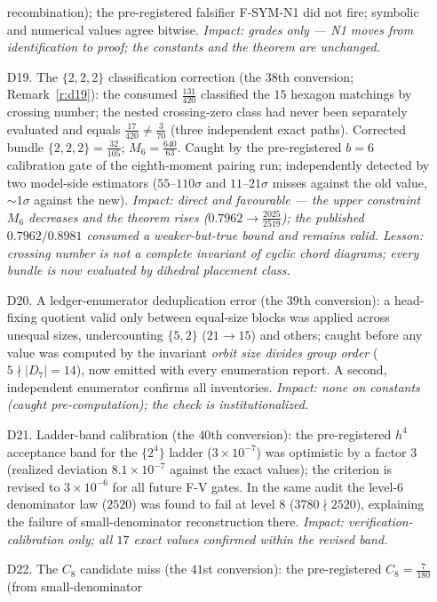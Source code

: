 \documentclass[11pt]{article}
\numberwithin{equation}{section}
\theoremstyle{definition}
\theoremstyle{remark}
\begin{document}
\begin{itemize}
recombination); the pre-registered falsifier F-SYM-N1 did not
fire; symbolic and numerical values agree bitwise.
\emph{Impact: grades only --- N1 moves from identification to
proof; the constants and the theorem are unchanged.}
\item[D19.] The $\{2,2,2\}$ classification correction (the
$38$th conversion; Remark~\ref{r:d19}): the consumed
$\tfrac{131}{420}$ classified the $15$ hexagon matchings by
crossing number; the nested crossing-zero class had never been
separately evaluated and equals $\tfrac{17}{420}\ne\tfrac3{70}$
(three independent exact paths). Corrected bundle
$\{2,2,2\}=\tfrac{32}{105}$; $M_6=\tfrac{640}{63}$. Caught by
the pre-registered $b=6$ calibration gate of the
eighth-moment pairing run; independently detected by two
model-side estimators ($55$--$110\sigma$ and $11$--$21\sigma$
misses against the old value, $\sim1\sigma$ against the new).
\emph{Impact: direct and favourable --- the upper constraint
$M_6$ decreases and the theorem rises
($0.7962\to\tfrac{2025}{2519}$); the published $0.7962/0.8981$
consumed a weaker-but-true bound and remains valid. Lesson:
crossing number is not a complete invariant of cyclic chord
diagrams; every bundle is now evaluated by dihedral placement
class.}
\item[D20.] A ledger-enumerator deduplication error (the
$39$th conversion): a head-fixing quotient valid only between
equal-size blocks was applied across unequal sizes, undercounting
$\{5,2\}$ ($21\to15$) and others; caught before any value was
computed by the invariant \emph{orbit size divides group
order} ($5\nmid|D_7|=14$), now emitted with every enumeration
report. A second, independent enumerator confirms all
inventories. \emph{Impact: none on constants (caught
pre-computation); the check is institutionalized.}
\item[D21.] Ladder-band calibration (the $40$th conversion):
the pre-registered $h^4$ acceptance band for the $\{2^4\}$
ladder ($3\times10^{-7}$) was optimistic by a factor $3$
(realized deviation $8.1\times10^{-7}$ against the exact
values); the criterion is revised to $3\times10^{-6}$ for all
future F-V gates. In the same audit the level-$6$ denominator
law ($2520$) was found to fail at level $8$
($3780\nmid2520$), explaining the failure of
small-denominator reconstruction there.
\emph{Impact: verification-calibration only; all $17$ exact
values confirmed within the revised band.}
\item[D22.] The $C_8$ candidate miss (the $41$st conversion):
the pre-registered $C_8=\tfrac7{180}$ (from small-denominator

\end{itemize}
\end{document}
